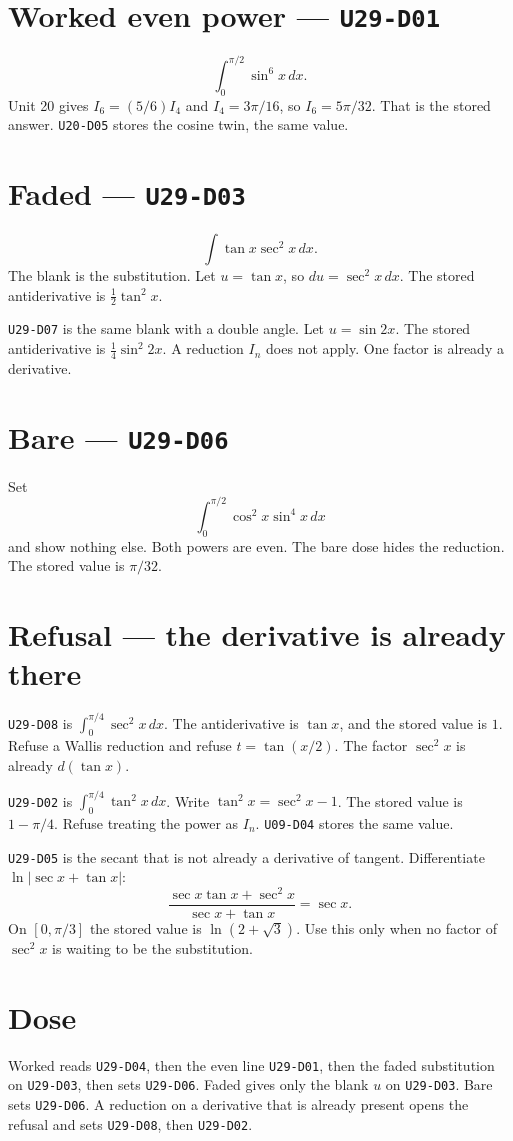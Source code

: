 \section{Worked even power --- \texttt{U29-D01}}
\[
\int_0^{\pi/2}\sin^6 x\,dx.
\]
Unit 20 gives $I_6=(5/6)I_4$ and $I_4=3\pi/16$, so $I_6=5\pi/32$. That is the stored answer. \texttt{U20-D05} stores the cosine twin, the same value.

\section{Faded --- \texttt{U29-D03}}
\[
\int\tan x\sec^2 x\,dx.
\]
The blank is the substitution. Let $u=\tan x$, so $du=\sec^2 x\,dx$. The stored antiderivative is $\frac12\tan^2 x$.

\texttt{U29-D07} is the same blank with a double angle. Let $u=\sin 2x$. The stored antiderivative is $\frac14\sin^2 2x$. A reduction $I_n$ does not apply. One factor is already a derivative.

\section{Bare --- \texttt{U29-D06}}
Set
\[
\int_0^{\pi/2}\cos^2 x\sin^4 x\,dx
\]
and show nothing else. Both powers are even. The bare dose hides the reduction. The stored value is $\pi/32$.

\section{Refusal --- the derivative is already there}
\texttt{U29-D08} is $\int_0^{\pi/4}\sec^2 x\,dx$. The antiderivative is $\tan x$, and the stored value is $1$. Refuse a Wallis reduction and refuse $t=\tan(x/2)$. The factor $\sec^2 x$ is already $d(\tan x)$.

\texttt{U29-D02} is $\int_0^{\pi/4}\tan^2 x\,dx$. Write $\tan^2 x=\sec^2 x-1$. The stored value is $1-\pi/4$. Refuse treating the power as $I_n$. \texttt{U09-D04} stores the same value.

\texttt{U29-D05} is the secant that is not already a derivative of tangent. Differentiate $\ln|\sec x+\tan x|$:
\[
\frac{\sec x\tan x+\sec^2 x}{\sec x+\tan x}=\sec x.
\]
On $[0,\pi/3]$ the stored value is $\ln(2+\sqrt{3})$. Use this only when no factor of $\sec^2 x$ is waiting to be the substitution.

\section{Dose}
Worked reads \texttt{U29-D04}, then the even line \texttt{U29-D01}, then the faded substitution on \texttt{U29-D03}, then sets \texttt{U29-D06}. Faded gives only the blank $u$ on \texttt{U29-D03}. Bare sets \texttt{U29-D06}. A reduction on a derivative that is already present opens the refusal and sets \texttt{U29-D08}, then \texttt{U29-D02}.

